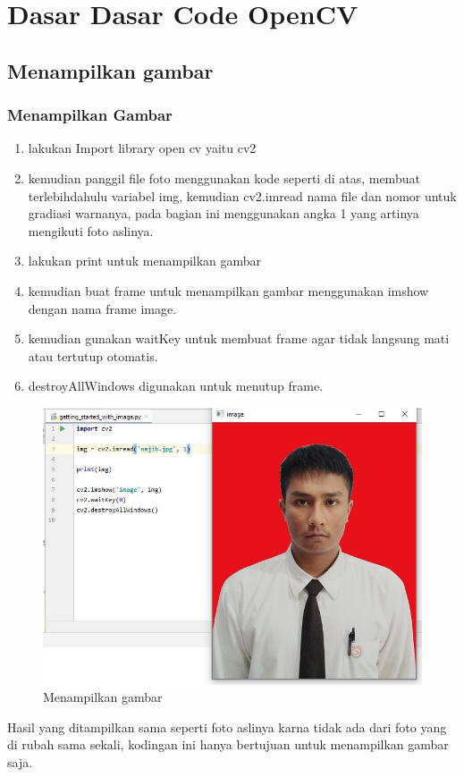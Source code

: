 \chapter{Dasar Dasar Code OpenCV}
\section{Menampilkan gambar}
\subsection{Menampilkan Gambar}


\begin{enumerate}
	\item lakukan Import library open cv yaitu cv2
	\item kemudian panggil file foto menggunakan kode seperti di atas, membuat terlebihdahulu variabel img, kemudian cv2.imread nama file dan nomor untuk gradiasi warnanya, pada bagian ini menggunakan angka 1 yang artinya mengikuti foto aslinya.
	\item lakukan print untuk menampilkan gambar
	\item kemudian buat frame untuk menampilkan gambar menggunakan imshow dengan nama frame image.
	\item kemudian gunakan waitKey untuk membuat frame agar tidak langsung mati atau tertutup otomatis.
	\item destroyAllWindows digunakan untuk menutup frame.
\end{enumerate}

\begin{figure}[ht]
\centering
\includegraphics[scale=0.5]{figures/2,2.jpg}
\caption{Menampilkan gambar}
\label{contoh}
\end{figure}
Hasil yang ditampilkan sama seperti foto aslinya karna tidak ada dari foto yang di rubah sama sekali, kodingan ini hanya bertujuan untuk menampilkan gambar saja.

